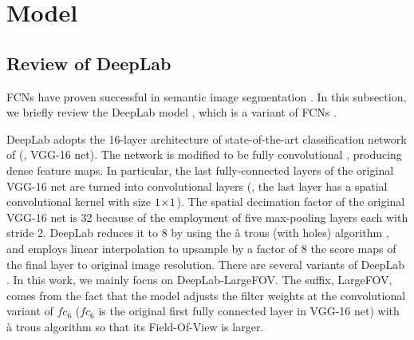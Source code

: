 \section{Model}
\label{sec:model}

\subsection{Review of DeepLab}
FCNs have proven successful in semantic image segmentation \cite{dai2015boxsup, liu2015semantic, zheng2015conditional}. In this subsection, we briefly review the DeepLab model \cite{chen2014semantic}, which is a variant of FCNs \cite{long2014fully}. 

DeepLab adopts the 16-layer architecture of state-of-the-art classification network of \cite{simonyan2014very} (\ie, VGG-16 net). The network is modified to be fully convolutional \cite{long2014fully}, producing dense feature maps. In particular, the last fully-connected layers of the original VGG-16 net are turned into convolutional layers (\eg, the last layer has a spatial convolutional kernel with size $1 \! \times \! 1$). The spatial decimation factor of the original VGG-16 net is 32 because of
the employment of five max-pooling layers each with stride $2$. DeepLab reduces it to 8 by using the {\`a} trous (with holes) algorithm \cite{Mall99}, and employs linear interpolation to upsample by a factor of 8 the score maps of the final layer to original image resolution. There are several variants of DeepLab \cite{chen2014semantic}. In this work, we mainly focus on DeepLab-LargeFOV. The suffix, LargeFOV, comes from the fact that the model adjusts the filter weights at the
convolutional variant of $fc_6$ ($fc_6$ is the original first fully connected layer in VGG-16 net) with {\`a} trous algorithm so that its Field-Of-View is larger. 


